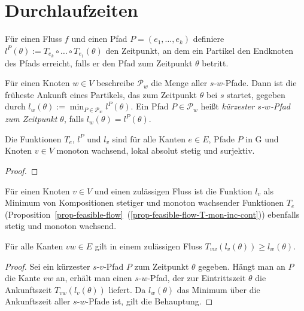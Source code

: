 \section{Durchlaufzeiten}

\begin{definition}
	Für einen Fluss $f$ und einen Pfad $P=(e_1,\dots,e_k)$ definiere $l^P(\theta):=T_{e_k}\circ\dots\circ T_{e_1}(\theta)$ den Zeitpunkt, an dem ein Partikel den Endknoten des Pfads erreicht, falls er den Pfad zum Zeitpunkt $\theta$ betritt.
	
	Für einen Knoten $w\in V$ beschreibe $\mathcal{P}_w$ die Menge aller $s$-$w$-Pfade.
	Dann ist die früheste Ankunft eines Partikels, das zum Zeitpunkt $\theta$ bei $s$ startet, gegeben durch $l_w(\theta):=\min_{P\in\mathcal{P}_w}l^P(\theta)$.
	Ein Pfad $P\in \mathcal{P}_w$ heißt \emph{kürzester $s$-$w$-Pfad zum Zeitpunkt $\theta$},  falls $l_w(\theta)=l^P(\theta)$.
\end{definition}

\begin{proposition}
	Die Funktionen $T_e$, $l^P$ und $l_v$ sind für alle Kanten $e\in E$, Pfade $P$ in G und Knoten $v\in V$ monoton wachsend, lokal absolut stetig und surjektiv.
\end{proposition}
\begin{proof}
	
\end{proof}


Für einen Knoten $v \in V$ und einen zulässigen Fluss ist die Funktion $l_v$ als Minimum von Kompositionen stetiger und monoton wachsender Funktionen $T_e$ (Proposition~\ref{prop-feasible-flow}~(\ref{prop-feasible-flow-T-mon-inc-cont})) ebenfalls stetig und monoton wachsend.


\begin{lemma}\label{lemma-dreicksungl}
	Für alle Kanten $vw\in E$ gilt in einem zulässigen Fluss 
	$T_{vw}(l_v(\theta)) \geq l_w(\theta)$.
\end{lemma}
\begin{proof}
	Sei ein kürzester $s$-$v$-Pfad $P$ zum Zeitpunkt $\theta$ gegeben.
	Hängt man an $P$ die Kante $vw$ an, erhält man einen $s$-$w$-Pfad, der zur Eintrittszeit $\theta$ die Ankunftszeit $T_{vw}(l_v(\theta))$ liefert.
	Da $l_w(\theta)$ das Minimum über die Ankunftszeit aller $s$-$w$-Pfade ist, gilt die Behauptung.
\end{proof}


